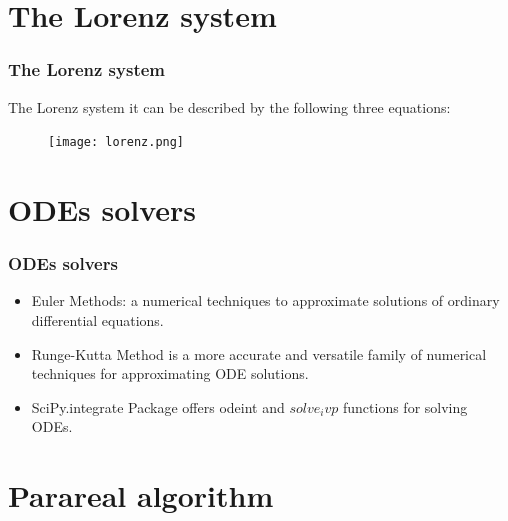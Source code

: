 \documentclass[
	11pt,
]{beamer}
\begin{document}
\section{The Lorenz system}

\begin{frame}
    \frametitle{The Lorenz system}

 The Lorenz system it can be described by the following three equations:
        \begin{figure}
                \texttt{[image: lorenz.png]}
            \end{figure}
 
\end{frame}

\section{ODEs solvers}

\begin{frame}
    \frametitle{ODEs solvers}
    
       \begin{itemize}
           \item Euler Methods: a numerical techniques to approximate solutions of ordinary differential equations.
           
           \item Runge-Kutta Method is a more accurate and versatile family of numerical techniques for approximating ODE solutions.
           
           \item SciPy.integrate Package offers odeint and $solve_ivp$ functions for solving ODEs. 
       \end{itemize}
	
\end{frame}


\section{Parareal algorithm}
\end{document}
